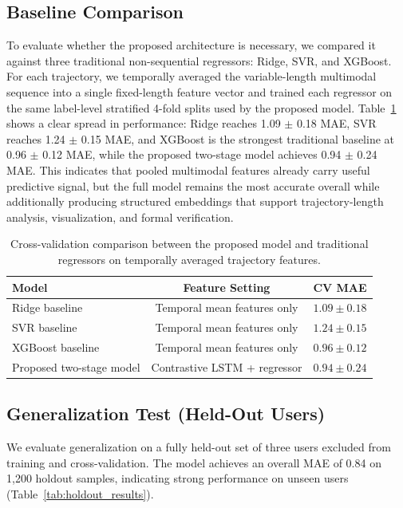 \documentclass[review]{vgtc}                 %
\begin{document}
\subsection{Baseline Comparison}
To evaluate whether the proposed architecture is necessary, we compared it against three traditional non-sequential regressors: Ridge, SVR, and XGBoost. For each trajectory, we temporally averaged the variable-length multimodal sequence into a single fixed-length feature vector and trained each regressor on the same label-level stratified 4-fold splits used by the proposed model. Table~\ref{tab:baseline_comparison} shows a clear spread in performance: Ridge reaches 1.09 $\pm$ 0.18 MAE, SVR reaches 1.24 $\pm$ 0.15 MAE, and XGBoost is the strongest traditional baseline at 0.96 $\pm$ 0.12 MAE, while the proposed two-stage model achieves 0.94 $\pm$ 0.24 MAE. This indicates that pooled multimodal features already carry useful predictive signal, but the full model remains the most accurate overall while additionally producing structured embeddings that support trajectory-length analysis, visualization, and formal verification.

\begin{table}[h]
    \centering
    \caption{Cross-validation comparison between the proposed model and traditional regressors on temporally averaged trajectory features.}
    \label{tab:baseline_comparison}
    \setlength{\tabcolsep}{8pt}
    \begin{tabular}{lcc}
        \toprule
        \textbf{Model} & \textbf{Feature Setting} & \textbf{CV MAE} \\
        \midrule
        Ridge baseline & Temporal mean features only & $1.09 \pm 0.18$ \\
        SVR baseline & Temporal mean features only & $1.24 \pm 0.15$ \\
        XGBoost baseline & Temporal mean features only & $0.96 \pm 0.12$ \\
        Proposed two-stage model & Contrastive LSTM + regressor & $0.94 \pm 0.24$ \\
        \bottomrule
    \end{tabular}
\end{table}

\subsection{Generalization Test (Held-Out Users)}
We evaluate generalization on a fully held-out set of three users excluded from training and cross-validation. The model achieves an overall MAE of 0.84 on 1{,}200 holdout samples, indicating strong performance on unseen users (Table~\ref{tab:holdout_results}).
\end{document}
